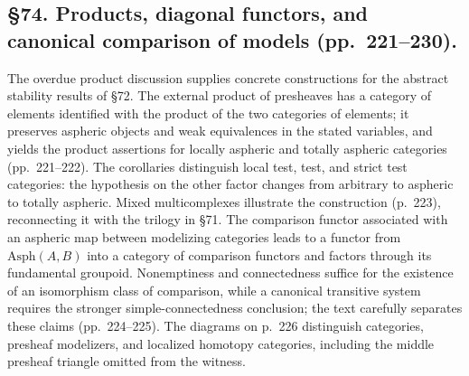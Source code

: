 \documentclass[10pt,oneside]{book}
\begin{document}
\subsection*{\S74. Products, diagonal functors, and canonical comparison of models (pp.\ 221--230).}
The overdue product discussion supplies concrete constructions for the abstract stability results of \S72. The external product of presheaves has a category of elements identified with the product of the two categories of elements; it preserves aspheric objects and weak equivalences in the stated variables, and yields the product assertions for locally aspheric and totally aspheric categories (pp.\ 221--222). The corollaries distinguish local test, test, and strict test categories: the hypothesis on the other factor changes from arbitrary to aspheric to totally aspheric. Mixed multicomplexes illustrate the construction (p.\ 223), reconnecting it with the trilogy in \S71. The comparison functor associated with an aspheric map between modelizing categories leads to a functor from $\mathrm{Asph}(A,B)$ into a category of comparison functors and factors through its fundamental groupoid. Nonemptiness and connectedness suffice for the existence of an isomorphism class of comparison, while a canonical transitive system requires the stronger simple-connectedness conclusion; the text carefully separates these claims (pp.\ 224--225). The diagrams on p.\ 226 distinguish categories, presheaf modelizers, and localized homotopy categories, including the middle presheaf triangle omitted from the witness.
\end{document}
